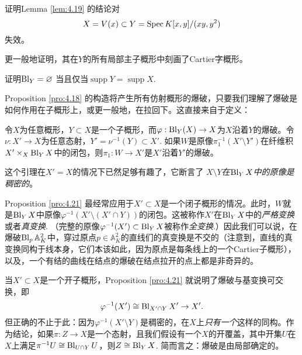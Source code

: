 \begin{exe}\label{exe:4.20}
	\begin{compactenum}[(a)]
		\item 证明Lemma \ref{lem:4.19} 的结论对
		\[
			X=V(x)\subset Y=\operatorname{Spec} K[x,y]/(xy,y^2)
		\]
		失效。
		\item 更一般地证明，其在$Y$的所有局部主子概形中刻画了Cartier字概形。
		\item 证明$\operatorname{Bl}_Y=\varnothing$ 当且仅当$\operatorname{supp} Y=\operatorname{supp} X$.
	\end{compactenum}
\end{exe}

Proposition \ref{pro:4.18} 的构造将产生所有仿射概形的爆破，只要我们理解了爆破是如何作用在子概形上，或更一般地，在拉回下。这直接来自于定义：

\begin{pro}\label{pro:4.21}
	令$X$为任意概形，$Y\subset X$是一个子概形，而$\varphi:\operatorname{Bl}_Y(X)\to X$为$X$沿着$Y$的爆破。令$\nu:X'\to X$为任意态射，$Y'=\nu^{-1}(Y)\subset X'$. 如果$W$是原像$\pi_1^{-1}(X'\setminus Y')$在纤维积$X'\times_X \operatorname{Bl}_Y X$中的闭包，则$\pi_1:W\to X'$是$X'$沿着$Y'$的爆破。
\end{pro}


这个引理在$X'=X$的情况下已然足够有趣了，它断言了 \textit{$X\setminus Y$在$\operatorname{Bl}_Y X$中的原像是稠密的}。

Proposition \ref{pro:4.21} 最经常应用于$X'\subset X$是一个闭子概形的情况。此时，$W$就是$\operatorname{Bl}_Y X$中原像$\varphi^{-1}(X'\setminus (X'\cap Y))$的闭包。这被称作$X'$在$\operatorname{Bl}_Y X$中的\textit{严格变换}或者\textit{真变换}. （完整的原像$\varphi^{-1}(X')\subset \operatorname{Bl}_Y X$被称作\textit{全变换}.）因此我们可以说，在爆破$\operatorname{Bl}_p \mathbb A_K^2$中，穿过原点$p\in \mathbb A_K^2$的直线们的真变换是不交的（注意到，直线的真变换同构于线本身，它们本该如此，因为原点是每条线上的一个Cartier子概形），以及，一个有结的曲线在结点的爆破在结点拉开的点上都是非奇异的。

当$X'\subset X$是一个开子概形，Proposition \ref{pro:4.21} 就说明了爆破与基变换可交换，即
\[
	\varphi^{-1}(X')\cong \operatorname{Bl}_{X'\cap Y}X'\to X'.
\]
但正确的不止于此：因为$\varphi^{-1}(X'\setminus Y)$是稠密的，在$X$上\textit{只有一个}这样的同构。作为结论，如果$\pi:Z\to X$是一个态射，且我们假设有一个$X$的开覆盖，其中开集$U$在$X$上满足$\pi^{-1}U\cong \operatorname{Bl}_{U\cap Y}U$，则$Z\cong \operatorname{Bl}_Y X$. 简而言之：爆破是由局部确定的。

